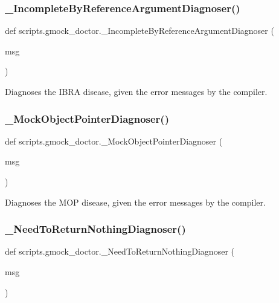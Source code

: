 \subsubsection{\texorpdfstring{\_IncompleteByReferenceArgumentDiagnoser()}{\_IncompleteByReferenceArgumentDiagnoser()}}
{\footnotesize\ttfamily def scripts.\+gmock\+\_\+doctor.\+\_\+\+Incomplete\+By\+Reference\+Argument\+Diagnoser (\begin{DoxyParamCaption}\item[{}]{msg }\end{DoxyParamCaption})\hspace{0.3cm}{\ttfamily [private]}}

\begin{DoxyVerb}Diagnoses the IBRA disease, given the error messages by the compiler.\end{DoxyVerb}
 \mbox{\label{namespacescripts_1_1gmock__doctor_aadd56fe5bdde0bbd24d43518b3ae4d86}} 
\subsubsection{\texorpdfstring{\_MockObjectPointerDiagnoser()}{\_MockObjectPointerDiagnoser()}}
{\footnotesize\ttfamily def scripts.\+gmock\+\_\+doctor.\+\_\+\+Mock\+Object\+Pointer\+Diagnoser (\begin{DoxyParamCaption}\item[{}]{msg }\end{DoxyParamCaption})\hspace{0.3cm}{\ttfamily [private]}}

\begin{DoxyVerb}Diagnoses the MOP disease, given the error messages by the compiler.\end{DoxyVerb}
 \mbox{\label{namespacescripts_1_1gmock__doctor_a552e21b6fc3015296d7e696f3a8db0da}} 
\subsubsection{\texorpdfstring{\_NeedToReturnNothingDiagnoser()}{\_NeedToReturnNothingDiagnoser()}}
{\footnotesize\ttfamily def scripts.\+gmock\+\_\+doctor.\+\_\+\+Need\+To\+Return\+Nothing\+Diagnoser (\begin{DoxyParamCaption}\item[{}]{msg }\end{DoxyParamCaption})\hspace{0.3cm}{\ttfamily [private]}}

